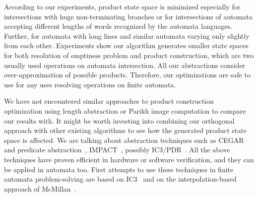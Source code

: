 According to our experiments, product state space is minimized especially for intersections with huge non-terminating branches or for intersections of automata accepting different lengths of words recognized by the automata languages. Further, for automata with long lines and similar automata varying only slightly from each other. Experiments show our algorithm generates smaller state spaces for both resolution of emptiness problem and product construction, which are two usually used operations on automata intersection. All our abstractions consider over-approximation of possible products. Therefore, our optimizations are safe to use for any uses resolving operations on finite automata.

We have not encountered similar approaches to product construction optimization using length abstraction or Parikh image computation to compare our results with. It might be worth investing into combining our orthogonal approach with other existing algorithms to see how the generated product state space is affected. We are talking about abstraction techniques such as CEGAR~\cite{DBLP:conf/cav/ClarkeGJLV00} and predicate abstraction~\cite{DBLP:conf/cav/ColonU98, DBLP:conf/cav/GrafS97}, IMPACT~\cite{DBLP:conf/cav/McMillan06}, possibly IC3/PDR~\cite{DBLP:conf/sat/HoderB12, DBLP:conf/fmcad/BradleyM07}. All the above techniques have proven efficient in hardware or software verification, and they can be applied in automata too. First attempts to use these techniques in finite automata problem-solving are based on IC3~\cite{DBLP:journals/pacmpl/HolikJLRV18, DBLP:conf/cav/WangTLYJ16, DBLP:journals/corr/abs-1708-09073} and on the interpolation-based approach of McMillan~\cite{DBLP:conf/tacas/AmlaM07, DBLP:conf/tacas/GangeNSSS13}.

